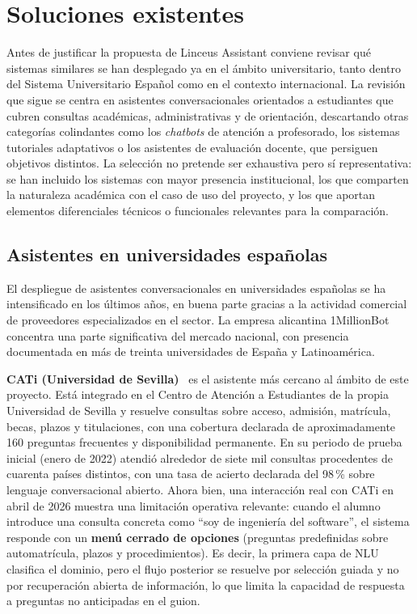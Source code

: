 
\section{Soluciones existentes}\label{sec:soluciones-existentes}

Antes de justificar la propuesta de Linceus Assistant conviene revisar qué sistemas similares se han desplegado ya en el ámbito universitario, tanto dentro del Sistema Universitario Español como en el contexto internacional. La revisión que sigue se centra en asistentes conversacionales orientados a estudiantes que cubren consultas académicas, administrativas y de orientación, descartando otras categorías colindantes como los \textit{chatbots} de atención a profesorado, los sistemas tutoriales adaptativos o los asistentes de evaluación docente, que persiguen objetivos distintos. La selección no pretende ser exhaustiva pero sí representativa: se han incluido los sistemas con mayor presencia institucional, los que comparten la naturaleza académica con el caso de uso del proyecto, y los que aportan elementos diferenciales técnicos o funcionales relevantes para la comparación.

\subsection{Asistentes en universidades españolas}\label{subsec:soluciones-espana}

El despliegue de asistentes conversacionales en universidades españolas se ha intensificado en los últimos años, en buena parte gracias a la actividad comercial de proveedores especializados en el sector. La empresa alicantina 1MillionBot~\cite{millionbotPlatform} concentra una parte significativa del mercado nacional, con presencia documentada en más de treinta universidades de España y Latinoamérica.

\textbf{CATi (Universidad de Sevilla)}~\cite{usCati,torrejuanaCati} es el asistente más cercano al ámbito de este proyecto. Está integrado en el Centro de Atención a Estudiantes de la propia Universidad de Sevilla y resuelve consultas sobre acceso, admisión, matrícula, becas, plazos y titulaciones, con una cobertura declarada de aproximadamente 160 preguntas frecuentes y disponibilidad permanente. En su periodo de prueba inicial (enero de 2022) atendió alrededor de siete mil consultas procedentes de cuarenta países distintos, con una tasa de acierto declarada del 98\,\% sobre lenguaje conversacional abierto. Ahora bien, una interacción real con CATi en abril de 2026 muestra una limitación operativa relevante: cuando el alumno introduce una consulta concreta como ``soy de ingeniería del software'', el sistema responde con un \textbf{menú cerrado de opciones} (preguntas predefinidas sobre automatrícula, plazos y procedimientos). Es decir, la primera capa de NLU clasifica el dominio, pero el flujo posterior se resuelve por selección guiada y no por recuperación abierta de información, lo que limita la capacidad de respuesta a preguntas no anticipadas en el guion.

